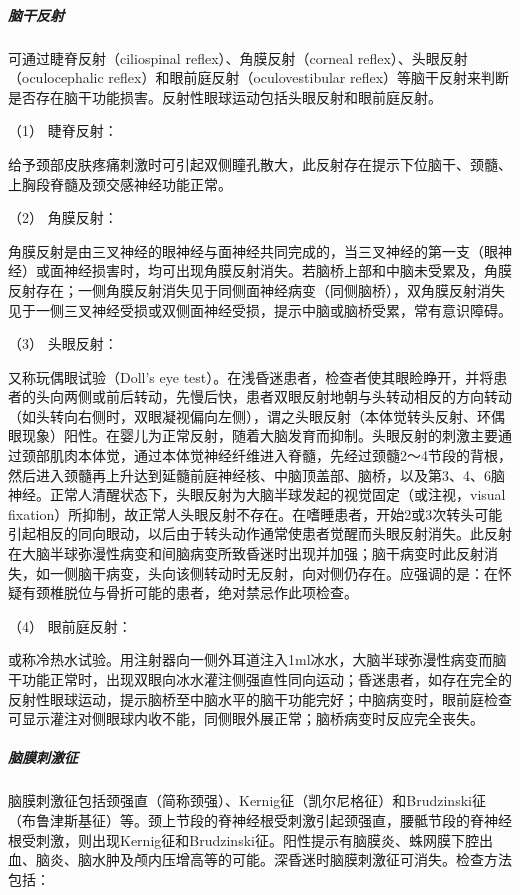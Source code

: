 \subparagraph{脑干反射}

可通过睫脊反射（ciliospinal reflex）、角膜反射（corneal
reflex）、头眼反射（oculocephalic reflex）和眼前庭反射（oculovestibular
reflex）等脑干反射来判断是否存在脑干功能损害。反射性眼球运动包括头眼反射和眼前庭反射。

\hypertarget{text00010.htmlux5cux23CHP1-2-2-1-3-4-1}{}
（1） 睫脊反射：

给予颈部皮肤疼痛刺激时可引起双侧瞳孔散大，此反射存在提示下位脑干、颈髓、上胸段脊髓及颈交感神经功能正常。

\hypertarget{text00010.htmlux5cux23CHP1-2-2-1-3-4-2}{}
（2） 角膜反射：

角膜反射是由三叉神经的眼神经与面神经共同完成的，当三叉神经的第一支（眼神经）或面神经损害时，均可出现角膜反射消失。若脑桥上部和中脑未受累及，角膜反射存在；一侧角膜反射消失见于同侧面神经病变（同侧脑桥），双角膜反射消失见于一侧三叉神经受损或双侧面神经受损，提示中脑或脑桥受累，常有意识障碍。

\hypertarget{text00010.htmlux5cux23CHP1-2-2-1-3-4-3}{}
（3） 头眼反射：

又称玩偶眼试验（Doll's eye
test）。在浅昏迷患者，检查者使其眼睑睁开，并将患者的头向两侧或前后转动，先慢后快，患者双眼反射地朝与头转动相反的方向转动（如头转向右侧时，双眼凝视偏向左侧），谓之头眼反射（本体觉转头反射、环偶眼现象）阳性。在婴儿为正常反射，随着大脑发育而抑制。头眼反射的刺激主要通过颈部肌肉本体觉，通过本体觉神经纤维进入脊髓，先经过颈髓2～4节段的背根，然后进入颈髓再上升达到延髓前庭神经核、中脑顶盖部、脑桥，以及第3、4、6脑神经。正常人清醒状态下，头眼反射为大脑半球发起的视觉固定（或注视，visual
fixation）所抑制，故正常人头眼反射不存在。在嗜睡患者，开始2或3次转头可能引起相反的同向眼动，以后由于转头动作通常使患者觉醒而头眼反射消失。此反射在大脑半球弥漫性病变和间脑病变所致昏迷时出现并加强；脑干病变时此反射消失，如一侧脑干病变，头向该侧转动时无反射，向对侧仍存在。应强调的是：在怀疑有颈椎脱位与骨折可能的患者，绝对禁忌作此项检查。

\hypertarget{text00010.htmlux5cux23CHP1-2-2-1-3-4-4}{}
（4） 眼前庭反射：

或称冷热水试验。用注射器向一侧外耳道注入1ml冰水，大脑半球弥漫性病变而脑干功能正常时，出现双眼向冰水灌注侧强直性同向运动；昏迷患者，如存在完全的反射性眼球运动，提示脑桥至中脑水平的脑干功能完好；中脑病变时，眼前庭检查可显示灌注对侧眼球内收不能，同侧眼外展正常；脑桥病变时反应完全丧失。

\subparagraph{脑膜刺激征}

脑膜刺激征包括颈强直（简称颈强）、Kernig征（凯尔尼格征）和Brudzinski征（布鲁津斯基征）等。颈上节段的脊神经根受刺激引起颈强直，腰骶节段的脊神经根受刺激，则出现Kernig征和Brudzinski征。阳性提示有脑膜炎、蛛网膜下腔出血、脑炎、脑水肿及颅内压增高等的可能。深昏迷时脑膜刺激征可消失。检查方法包括：

